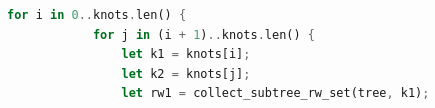 \begin{lstlisting}[language=Rust, caption={Read-Write Independence Analysis (\texttt{src/mir/supercompiler/independence.rs}).}, label={lst:indep_impl}]
        for i in 0..knots.len() {
            for j in (i + 1)..knots.len() {
                let k1 = knots[i];
                let k2 = knots[j];
                let rw1 = collect_subtree_rw_set(tree, k1);

\end{lstlisting}
